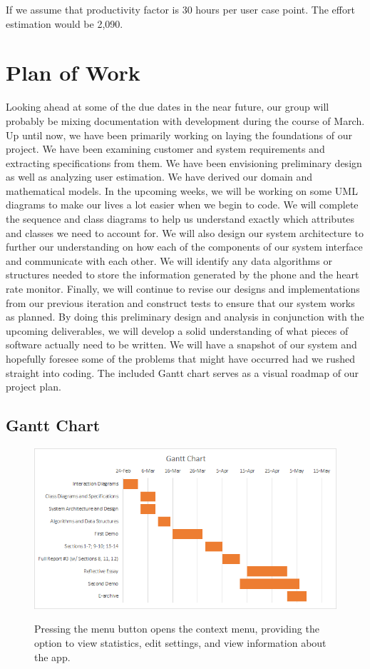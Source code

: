 \documentclass[letterpaper,english, 12pt]{scrreprt}
\begin{document}
If we assume that productivity factor is 30 hours per user case point. The effort estimation would be 2,090.

\chapter{Plan of Work}
Looking ahead at some of the due dates in the near future, our group will probably be mixing documentation with development during the course of March. Up until now, we have been primarily working on laying the foundations of our project. We have been examining customer and system requirements and extracting specifications from them. We have been envisioning preliminary design as well as analyzing user estimation. We have derived our domain and mathematical models. 
In the upcoming weeks, we will be working on some UML diagrams to make our lives a lot easier when we begin to code. We will complete the sequence and class diagrams to help us understand exactly which attributes and classes we need to account for. We will also design our system architecture to further our understanding on how each of the components of our system interface and communicate with each other. We will identify any data algorithms or structures needed to store the information generated by the phone and the heart rate monitor. Finally, we will continue to revise our designs and implementations from our previous iteration and construct tests to ensure that our system works as planned.
By doing this preliminary design and analysis in conjunction with the upcoming deliverables, we will develop a solid understanding of what pieces of software actually need to be written. We will have a snapshot of our system and hopefully foresee some of the problems that might have occurred had we rushed straight into coding.
The included Gantt chart serves as a visual roadmap of our project plan.

\section{Gantt Chart}
\begin{figure}[H]
	\centering
	\includegraphics{img/Gantt_Chart.png}\\
	\caption{Pressing the menu button opens the context menu, providing the option to view statistics, edit settings, and view information about the app.}
\end{figure}
\end{document}
